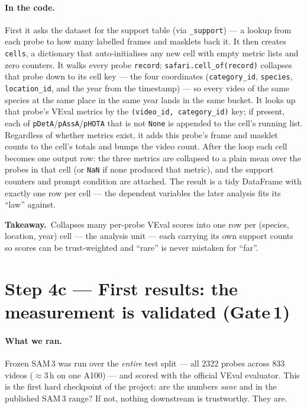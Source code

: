 \documentclass[11pt,a4paper]{article}
\newcommand{\code}[1]{\texttt{#1}}
\newcommand{\takeaway}[1]{\smallskip\noindent%
  \colorbox{forest!8}{\parbox{\dimexpr\linewidth-2\fboxsep\relax}{%
  \small{\color{forest}\textbf{Takeaway.}}\ #1}}\smallskip}
\begin{document}
\paragraph{In the code.}
First it asks the dataset for the support table (via \code{\_support}) --- a lookup from each probe to how
many labelled frames and masklets back it. It then creates \code{cells}, a dictionary that auto-initialises
any new cell with empty metric lists and zero counters. It walks every probe \code{record};
\code{safari.cell\_of(record)} collapses that probe down to its cell key --- the four coordinates
(\code{category\_id}, \code{species}, \code{location\_id}, and the year from the timestamp) --- so every
video of the same species at the same place in the same year lands in the same bucket. It looks up that
probe's VEval metrics by the \code{(video\_id, category\_id)} key; if present, each of
\code{pDetA}/\code{pAssA}/\code{pHOTA} that is not \code{None} is appended to the cell's running list.
Regardless of whether metrics exist, it adds this probe's frame and masklet counts to the cell's totals and
bumps the video count. After the loop each cell becomes one output row: the three metrics are collapsed to a
plain mean over the probes in that cell (or \code{NaN} if none produced that metric), and the support
counters and prompt condition are attached. The result is a tidy DataFrame with exactly one row per cell ---
the dependent variables the later analysis fits its ``law'' against.

\takeaway{Collapses many per-probe VEval scores into one row per (species, location, year) cell --- the
analysis unit --- each carrying its own support counts so scores can be trust-weighted and ``rare'' is
never mistaken for ``far''.}

\section{Step 4c --- First results: the measurement is validated (Gate\,1)}
\label{sec:gate1}

\paragraph{What we ran.}
Frozen SAM\,3 was run over the \emph{entire} test split --- all $2322$ probes across $833$ videos
($\approx$3\,h on one A100) --- and scored with the official VEval evaluator. This is the first hard
checkpoint of the project: are the numbers \emph{sane} and in the published SAM\,3 range? If not, nothing
downstream is trustworthy. They are.
\end{document}
